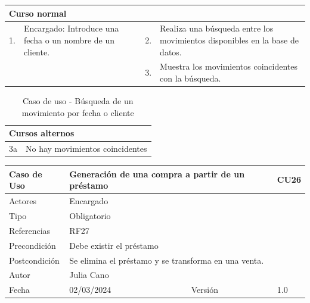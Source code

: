\begin{table}[H]
	\centering
	\begin{tabular}{| m{} | m{} | m{} | m{} |}
		\hline
		\multicolumn{4}{|m{0.9\textwidth}|}{Curso normal}     \\ 
		\hline
		1. & Encargado: Introduce una fecha o un nombre de un cliente. & 2. &  Realiza una búsqueda entre los movimientos disponibles en la base de datos.  \\ 
		\hline
		&  & 3. &  Muestra los movimientos coincidentes con la búsqueda.  \\ 
		\hline
	\end{tabular}
\end{table}

\begin{table}[H]
	\centering
	\begin{tabular}{| m{} | m{} | m{} | m{} |}
		\hline
		\multicolumn{4}{|m{0.9\textwidth}|}{Cursos alternos}     \\ 
		\hline
		3a & \multicolumn{3}{m{0.67\textwidth}|}{No hay movimientos coincidentes} \\ 
		\hline
	\end{tabular}
	\caption{Caso de uso - Búsqueda de un movimiento por fecha o cliente}
\end{table}

\newpage


\begin{table}[H]
	\centering
	\begin{tabular}{| m{} | m{} | m{} | m{}|}
		\hline
		\rowcolor{grayshade} Caso de Uso & \multicolumn{2}{|m{0.43\textwidth}|}{Generación de una compra a partir de un préstamo} &  CU26\\ 
		\hline
		Actores & \multicolumn{3}{l|}{Encargado} \\ 
		\hline
		Tipo & \multicolumn{3}{l|}{Obligatorio} \\ 
		\hline
		Referencias & \multicolumn{3}{l|}{RF27} \\ 
		\hline
		Precondición & \multicolumn{3}{m{0.67\textwidth}|}{Debe existir el préstamo} \\ 
		\hline
		Postcondición & \multicolumn{3}{m{0.67\textwidth}|}{Se elimina el préstamo y se transforma en una venta.} \\ 
		\hline
		Autor & \multicolumn{3}{l|}{Julia Cano} \\ 
		\hline
		Fecha & 02/03/2024 & Versión & 1.0 \\
		\hline
	\end{tabular}
\end{table}

